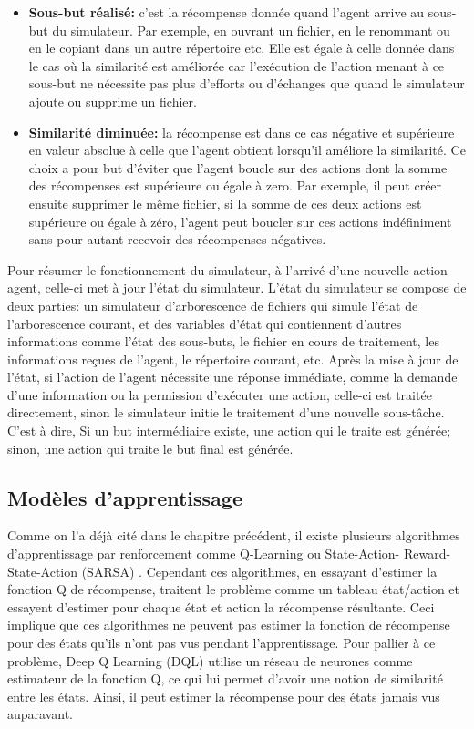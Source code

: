 \begin{itemize}
	\item \textbf{Sous-but réalisé:} c'est la récompense donnée quand l'agent arrive au sous-but du simulateur. Par exemple, en ouvrant un fichier, en le renommant ou en le copiant dans un autre répertoire etc. Elle est égale à celle donnée dans le cas où la similarité est améliorée car l'exécution de l'action menant à ce sous-but ne nécessite pas plus d'efforts ou d'échanges que quand le simulateur ajoute ou supprime un fichier.
	\item \textbf{Similarité diminuée:} la récompense est dans ce cas négative et supérieure en valeur absolue à celle que l'agent obtient lorsqu'il améliore la similarité. Ce choix a pour but d'éviter que l'agent boucle sur des actions dont la somme des récompenses est supérieure ou égale à zero. Par exemple, il peut créer ensuite supprimer le même fichier, si la somme de ces deux actions est supérieure ou égale à zéro, l'agent peut boucler sur ces actions indéfiniment sans pour autant recevoir des récompenses négatives.
\end{itemize}
Pour résumer le fonctionnement du simulateur, à l'arrivé d'une nouvelle action agent, celle-ci met à jour l'état du simulateur. L'état du simulateur se compose de deux parties: un simulateur d'arborescence de fichiers qui simule l'état de l'arborescence courant, et des variables d'état qui contiennent d'autres informations comme l'état des sous-buts, le fichier en cours de traitement, les informations reçues de l'agent, le répertoire courant, etc. Après la mise à jour de l'état, si l'action de l'agent nécessite une réponse immédiate, comme la demande d'une information ou la permission d'exécuter une action, celle-ci est traitée directement, sinon le simulateur initie le traitement d'une nouvelle sous-tâche. C'est à dire, Si un but intermédiaire existe, une action qui le traite est générée; sinon, une action qui traite le but final est générée.
\subsection{Modèles d'apprentissage}\label{DQL}
Comme on l'a déjà cité dans le chapitre précédent, il existe plusieurs algorithmes d'apprentissage par renforcement comme Q-Learning ou State-Action- Reward-State-Action (SARSA) \citep{Rummery1994}. Cependant ces algorithmes, en essayant d'estimer la fonction Q de récompense, traitent le problème comme un tableau état/action et essayent d'estimer pour chaque état et action la récompense résultante. Ceci implique que ces algorithmes ne peuvent pas estimer la fonction de récompense pour des états qu'ils n'ont pas vus pendant l'apprentissage. Pour pallier à ce problème, Deep Q Learning (DQL)\citep{Mnih2015} utilise un réseau de neurones comme estimateur de la fonction Q, ce qui lui permet d'avoir une notion de similarité entre les états. Ainsi, il peut estimer la récompense pour des états jamais vus auparavant.
